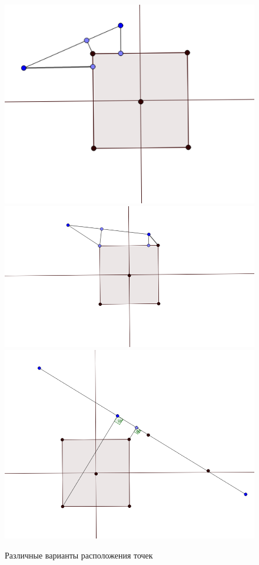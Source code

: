 \begin{figure}[ht!]
\begin{center}
\includegraphics[scale=0.4]{images/conv_case1}
\includegraphics[scale=0.4]{images/conv_case2}
\includegraphics[scale=0.4]{images/conv_case3}
\end{center}
\vspace*{-8mm}
\caption{Различные варианты расположения точек}\label{fig:conv_case}
\end{figure}

